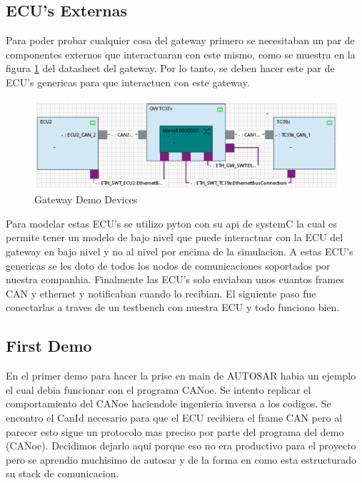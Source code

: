 \subsection{ECU's Externas}

Para poder probar cualquier cosa del gateway primero se necesitaban un par de componentes externos que interactuaran con este mismo, como se muestra en la figura \ref{fig:devices-diagram} del datasheet del gateway. Por lo tanto, se deben hacer este par de ECU's genericas para que interactuen con este gateway.

\begin{figure}[!htb]
 \centering
 \includegraphics[width=\textwidth]{img/GWDemoConnections.PNG}
 \caption{Gateway Demo Devices}
 \label{fig:devices-diagram}
\end{figure}

Para modelar estas ECU's se utilizo pyton con su api de systemC la cual es permite tener un modelo de bajo nivel que puede interactuar con la ECU del gateway en bajo nivel y no al nivel por encima de la simulacion. A estas ECU's genericas se les doto de todos los nodos de comunicaciones soportados por nuestra companhia. Finalmente las ECU's solo enviaban unos cuantos frames CAN y ethernet y notificaban cuando lo recibian. El siguiente paso fue conectarlas a traves de un testbench con nuestra ECU y todo funciono bien.

\subsection{First Demo}
En el primer demo para hacer la prise en main de AUTOSAR habia un ejemplo el cual debia funcionar con el programa CANoe. Se intento replicar el comportamiento del CANoe haciendole ingenieria inversa a los codigos. Se encontro el CanId necesario para que el ECU recibiera el frame CAN pero al parecer esto sigue un protocolo mas preciso por parte del programa del demo (CANoe). Decidimos dejarlo aqui porque eso no era productivo para el proyecto pero se aprendio muchisimo de autosar y de la forma en como esta estructurado su stack de comunicacion.


